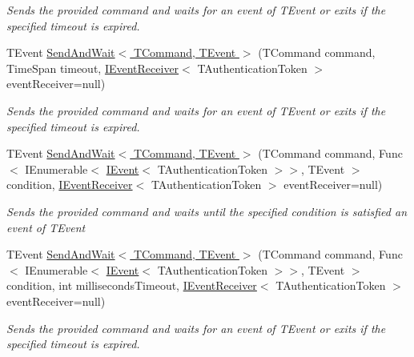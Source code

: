 \begin{DoxyCompactItemize}
\begin{DoxyCompactList}\small\item\em Sends the provided {\itshape command}  and waits for an event of {\itshape T\+Event}  or exits if the specified timeout is expired. \end{DoxyCompactList}\item 
T\+Event \hyperlink{classCqrs_1_1Akka_1_1Commands_1_1ConcurrentAkkaCommandSender_ad838e5f54cae4ff87d091feefc00d930_ad838e5f54cae4ff87d091feefc00d930}{Send\+And\+Wait$<$ T\+Command, T\+Event $>$} (T\+Command command, Time\+Span timeout, \hyperlink{interfaceCqrs_1_1Events_1_1IEventReceiver}{I\+Event\+Receiver}$<$ T\+Authentication\+Token $>$ event\+Receiver=null)
\begin{DoxyCompactList}\small\item\em Sends the provided {\itshape command}  and waits for an event of {\itshape T\+Event}  or exits if the specified timeout is expired. \end{DoxyCompactList}\item 
T\+Event \hyperlink{classCqrs_1_1Akka_1_1Commands_1_1ConcurrentAkkaCommandSender_a4fa4c2475a650e903b59013e939695f2_a4fa4c2475a650e903b59013e939695f2}{Send\+And\+Wait$<$ T\+Command, T\+Event $>$} (T\+Command command, Func$<$ I\+Enumerable$<$ \hyperlink{interfaceCqrs_1_1Events_1_1IEvent}{I\+Event}$<$ T\+Authentication\+Token $>$$>$, T\+Event $>$ condition, \hyperlink{interfaceCqrs_1_1Events_1_1IEventReceiver}{I\+Event\+Receiver}$<$ T\+Authentication\+Token $>$ event\+Receiver=null)
\begin{DoxyCompactList}\small\item\em Sends the provided {\itshape command}  and waits until the specified condition is satisfied an event of {\itshape T\+Event}  \end{DoxyCompactList}\item 
T\+Event \hyperlink{classCqrs_1_1Akka_1_1Commands_1_1ConcurrentAkkaCommandSender_a17a0d4fa182f4288a5a6c48d6df1801b_a17a0d4fa182f4288a5a6c48d6df1801b}{Send\+And\+Wait$<$ T\+Command, T\+Event $>$} (T\+Command command, Func$<$ I\+Enumerable$<$ \hyperlink{interfaceCqrs_1_1Events_1_1IEvent}{I\+Event}$<$ T\+Authentication\+Token $>$$>$, T\+Event $>$ condition, int milliseconds\+Timeout, \hyperlink{interfaceCqrs_1_1Events_1_1IEventReceiver}{I\+Event\+Receiver}$<$ T\+Authentication\+Token $>$ event\+Receiver=null)
\begin{DoxyCompactList}\small\item\em Sends the provided {\itshape command}  and waits for an event of {\itshape T\+Event}  or exits if the specified timeout is expired. \end{DoxyCompactList}\item 

\end{DoxyCompactItemize}
